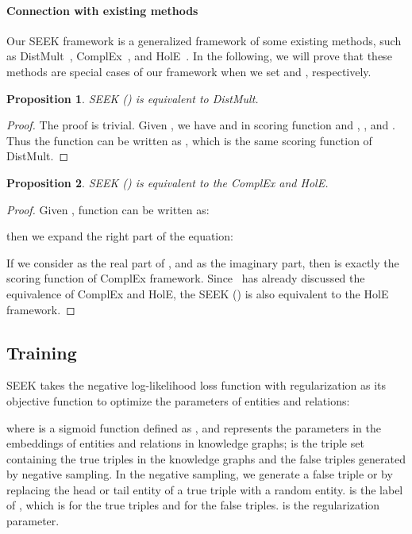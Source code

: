 \documentclass[11pt,a4paper]{article}
\newtheorem{proposition}{Proposition}
\begin{document}
\paragraph{Connection with existing methods}
Our SEEK framework is a generalized framework of some existing methods, such as DistMult~\cite{yang2015embedding}, ComplEx~\cite{trouillon2016complex}, and HolE~\cite{nickel2016holographic}. In the following, we will prove that these methods are special cases of our framework when we set  and , respectively.
\begin{proposition}
	SEEK () is equivalent to DistMult.
\end{proposition}
\begin{proof}
	The proof is trivial. Given , we have  and  in scoring function  and , , and . Thus the function  can be written as , which is the same scoring function of DistMult.
\end{proof}
\begin{proposition}
	SEEK () is equivalent to the ComplEx and HolE.
\end{proposition}
\begin{proof}
	Given , function  can be written as:
	
	then we expand the right part of the equation:
	
	If we consider  as the real part of , and  as the imaginary part,
	then  is exactly the scoring function of ComplEx framework. Since~\cite{hayashi2017equivalence} has already discussed the equivalence of ComplEx and HolE, the SEEK () is also equivalent to the HolE framework.
\end{proof}

\subsection{Training}
SEEK takes the negative log-likelihood loss function with  regularization as its objective function to optimize the parameters of entities and relations:

where  is a sigmoid function defined as , and  represents the parameters in the embeddings of entities and relations in knowledge graphs;  is the triple set containing the true triples in the knowledge graphs and the false triples generated by negative sampling. In the negative sampling, we generate a false triple  or  by replacing the head or tail entity of a true triple with a random entity.  is the label of , which is  for the true triples and  for the false triples.  is the  regularization parameter.
\end{document}
